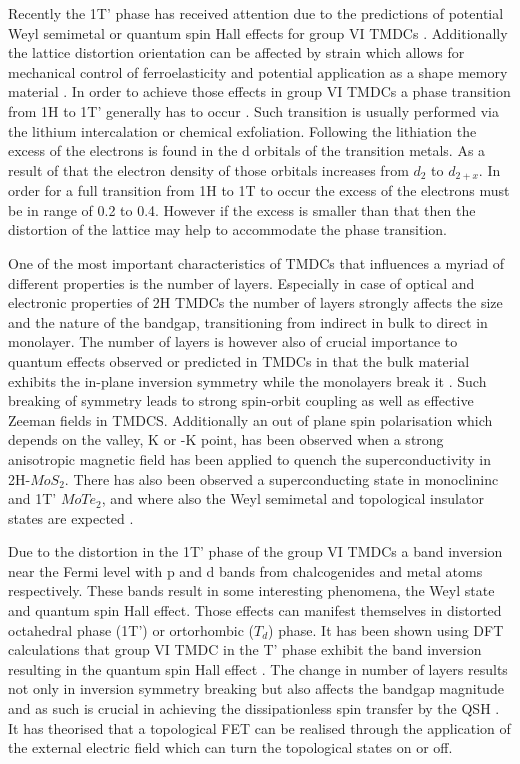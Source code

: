 Recently the 1T' phase has received attention due to the predictions of potential Weyl semimetal or quantum spin Hall effects for group VI TMDCs \cite{Qian2014}\cite{Sun2015}. Additionally the lattice distortion orientation can be affected by strain which allows for mechanical control of ferroelasticity and potential application as a shape memory material \cite{Li2016}. In order to achieve those effects in group VI TMDCs a phase transition from 1H to 1T' generally has to occur \cite{Chhowalla2013}. Such transition is usually performed via the lithium intercalation or chemical exfoliation. Following the lithiation the excess of the electrons is found in the d orbitals of the transition metals. As a result of that the electron density of those orbitals increases from $d_2$ to $d_{2+x}$. In order for a full transition from 1H to 1T to occur the excess of the electrons must be in range of 0.2 to 0.4. However if the excess is smaller than that then the distortion of the lattice may help to accommodate the phase transition.

One of the most important characteristics of TMDCs that influences a myriad of different properties is the number of layers. Especially in case of optical and electronic properties of 2H TMDCs the number of layers strongly affects the size and the nature of the bandgap, transitioning from indirect in bulk to direct in monolayer. The number of layers is however also of crucial importance to quantum effects observed or predicted in TMDCs in that the bulk material exhibits the in-plane inversion symmetry while the monolayers break it \cite{Saito2015}\cite{Lu2015}. Such breaking of symmetry leads to strong spin-orbit coupling as well as effective Zeeman fields in TMDCS. Additionally an out of plane spin polarisation which depends on the valley, K or -K point, has been observed when a strong anisotropic magnetic field has been applied to quench the superconductivity in 2H-$MoS_2$. There has also been observed a superconducting state in monoclininc and 1T' $MoTe_2$, and where also the Weyl semimetal and topological insulator states are expected \cite{Qian2014}\cite{Sun2015}\cite{Qi2016}.

Due to the distortion in the 1T' phase of the group VI TMDCs a band inversion near the Fermi level with p and d bands from chalcogenides and metal atoms respectively. These bands result in some interesting phenomena, the Weyl state and quantum spin Hall effect. Those effects can manifest themselves in distorted octahedral phase (1T') or ortorhombic ($T_d$) phase. It has been shown using DFT calculations that group VI TMDC in the T' phase exhibit the band inversion resulting in the quantum spin Hall effect \cite{Qian2014}\cite{Choe2016}. The change in number of layers results not only in inversion symmetry breaking but also affects the bandgap magnitude and as such is crucial in achieving the dissipationless spin transfer by the QSH \cite{Kane2005}\cite{Konig2007}. It has theorised that a topological FET can be realised through the application of the external electric field which can turn the topological states on or off.

